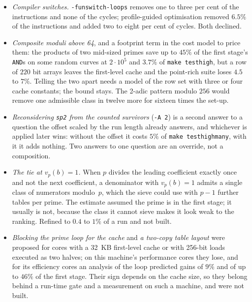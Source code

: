 \documentclass[12pt,a4paper,oneside]{amsart}
\begin{document}
\begin{itemize}
        per cent by the rule, a group containing a survivor wastes its whole
        \texttt{OR}, and a group of one wins. Per-chunk survivor flags
        computed in the first stage were prototyped three ways: the branchy
        form mispredicted, the branchless forms spilled, since all sixteen
        vector registers hold live arrays. The sentinel was the answer.
  \item \emph{Compiler switches.} \texttt{-funswitch-loops} removes one to
        three per cent of the instructions and none of the cycles;
        profile-guided optimisation removed $6.5\%$ of the instructions and
        added two to eight per cent of cycles. Both declined.
  \item \emph{Composite moduli above 64}, and a footprint term in the cost
        model to price them: the products of two mid-sized primes save up to
        $45\%$ of the first stage's \texttt{AND}s on some random curves at
        $2\cdot10^5$ and $3.7\%$ of \texttt{make testhigh}, but a row of $220$
        bit arrays leaves the first-level cache and the point-rich suite
        loses $4.5$ to $7\%$. Telling the two apart needs a model of the row
        set with three or four cache constants; the bound stays. The 2-adic
        pattern modulo $256$ would remove one admissible class in twelve more
        for sixteen times the set-up.
  \item \emph{Reconsidering \texttt{sp2} from the counted survivors}
        (\verb+-A 2+) is a second answer to a question the offset scaled by
        the run length already answers, and whichever is applied later wins:
        without the offset it costs $5\%$ of \texttt{make testhighmany}, with
        it it adds nothing. Two answers to one question are an override, not
        a composition.
  \item \emph{The tie at $v_p(b) = 1$.} When $p$ divides the leading
        coefficient exactly once and not the next coefficient, a denominator
        with $v_p(b) = 1$ admits a single class of numerators modulo~$p$,
        which the sieve could use with $p - 1$ further tables per prime. The
        estimate assumed the prime is in the first stage; it usually is not,
        because the class it cannot sieve makes it look weak to the ranking.
        Refined to $0.4$ to $1\%$ of a run and not built.
  \item \emph{Blocking the prime loop for the cache} and \emph{a two-copy
        table layout} were proposed for cores with a 32~KB first-level cache
        or with 256-bit loads executed as two halves; on this machine's
        performance cores they lose, and for its efficiency cores an
        analysis of the loop predicted gains of $9\%$ and of up to $46\%$ of
        the first stage. Their sign depends on the cache size, so they belong
        behind a run-time gate and a measurement on such a machine, and were
        not built.
\end{itemize}
\end{document}
